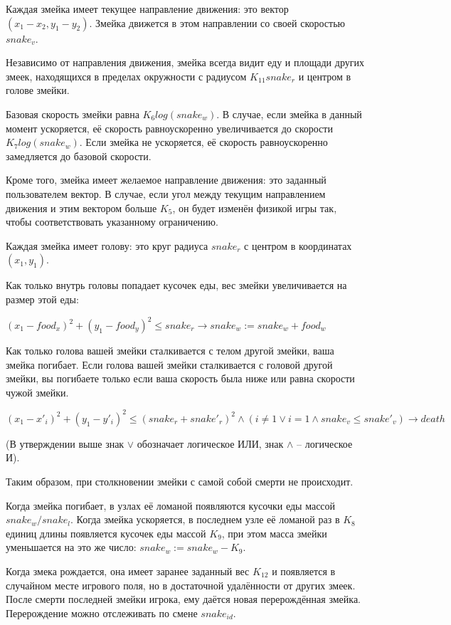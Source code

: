 \documentclass[12pt, a4paper]{article}
\begin{document}
Каждая змейка имеет текущее направление движения: это вектор $(x_1 - x_2, y_1 - y_2)$. Змейка движется в этом направлении со своей скоростью $snake_v$.

Независимо от направления движения, змейка всегда видит еду и площади других змеек, находящихся в пределах окружности с радиусом $K_{11} snake_r$ и центром в голове змейки.

Базовая скорость змейки равна $K_6 log(snake_w)$. В случае, если змейка в данный момент ускоряется, её скорость равноускоренно увеличивается до скорости $K_7 log(snake_w)$. Если змейка не ускоряется, её скорость равноускоренно замедляется до базовой скорости.

Кроме того, змейка имеет желаемое направление движения: это заданный пользователем вектор. В случае, если угол между текущим направлением движения и этим вектором больше $K_5$, он будет изменён физикой игры так, чтобы соответствовать указанному ограничению.

Каждая змейка имеет голову: это круг радиуса $snake_r$ с центром в координатах $(x_1, y_1)$.

Как только внутрь головы попадает кусочек еды, вес змейки увеличивается на размер этой еды:

$(x_1 - food_x)^2 + (y_1 - food_y)^2 \le snake_r \rightarrow snake_w := snake_w + food_w$

Как только голова вашей змейки сталкивается с телом другой змейки, ваша змейка погибает.
Если голова вашей змейки сталкивается с головой другой змейки, вы погибаете только если ваша скорость была ниже или равна скорости чужой змейки.

$(x_1 - x'_i)^2 + (y_1 - y'_i)^2 \le (snake_r + snake'_r)^2 \land (i \ne 1 \lor i = 1 \land snake_v \le snake'_v) \rightarrow death$

(В утверждении выше знак $\lor$ обозначает логическое ИЛИ, знак $\land$ -- логическое И).

Таким образом, при столкновении змейки с самой собой смерти не происходит.

Когда змейка погибает, в узлах её ломаной появляются кусочки еды массой $snake_w / snake_l$.
Когда змейка ускоряется, в последнем узле её ломаной раз в $K_8$ единиц длины появляется кусочек еды массой $K_9$, при этом масса змейки уменьшается на это же число: $snake_w := snake_w - K_9$.

Когда змека рождается, она имеет заранее заданный вес $K_12$ и появляется в случайном месте игрового поля, но в достаточной удалённости от других змеек. После смерти последней змейки игрока, ему даётся новая перерождённая змейка. Перерождение можно отслеживать по смене $snake_{id}$. 
\end{document}
